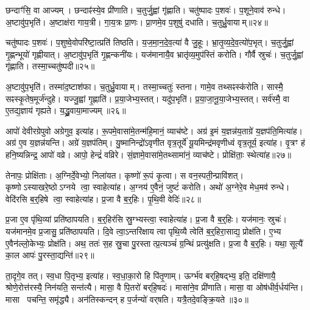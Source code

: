 छन्दाꣳ॑सि॒ वा आज्यम्।
छन्दाꣴ॑स्ये॒व प्री॑णाति।
च॒तुर्जु॒ह्वां गृ॑ह्णाति।
चतु॑ष्पादः प॒शवः॑।
प॒शूने॒वाव॑ रुन्धे।
अ॒ष्टावु॑प॒भृति॑।
अ॒ष्टाक्ष॑रा गाय॒त्री।
गा॒य॒त्रः प्रा॒णः।
प्रा॒णमे॒व प॒शुषु॑ दधाति।
च॒तुर्ध्रु॒वायाम्॥२४॥

चतु॑ष्पादः प॒शवः॑।
प॒शुष्वे॒वोपरि॑ष्टा॒त्प्रति॑ तिष्ठति।
य॒ज॒मा॒न॒दे॒व॒त्या॑ वै जु॒हूः।
भ्रा॒तृ॒व्य॒दे॒व॒त्यो॑प॒भृत्।
च॒तुर्जु॒ह्वां गृ॒ह्णन्भूयो॑ गृह्णीयात्।
अ॒ष्टावु॑प॒भृति॑ गृ॒ह्णन्कनी॑यः।
यज॑मानायै॒व भ्रातृ॑व्य॒मुप॑स्तिं करोति।
गौर्वै स्रुचः॑।
च॒तुर्जु॒ह्वां गृ॑ह्णाति।
तस्मा॒च्चतु॑ष्पदी॥२५॥

अ॒ष्टावु॑प॒भृति॑।
तस्मा॑द॒ष्टाश॑फा।
च॒तुर्ध्रु॒वायाम्।
तस्मा॒च्चतुः॑ स्तना।
गामे॒व तथ्सꣴस्क॑रोति।
सास्मै॒ सꣴस्कृ॒तेष॒मूर्ज॑न्दुहे।
यज्जु॒ह्वां गृ॒ह्णाति॑।
प्र॒या॒जेभ्य॒स्तत्।
यदु॑प॒भृति॑।
प्र॒या॒जा॒नू॒या॒जेभ्य॒स्तत्।
सर्व॑स्मै॒ वा ए॒तद्य॒ज्ञाय॑ गृह्यते।
य॒द्ध्रु॒वाया॒माज्यम्॥२६॥\anuvakamend[अ॒भि॒घा॒रय॑ति गृह्णाति ध्रु॒वायां॒ चतु॑ष्पदी प्रयाजानूया॒जेभ्य॒स्तद्द्वे च॑]

आपो॑ देवीरग्रेपुवो अग्रेगुव॒ इत्या॑ह।
रू॒पमे॒वासा॑मे॒तन्म॑हि॒मानं॒ व्याच॑ष्टे।
अग्र॑ इ॒मं य॒ज्ञन्न॑य॒ताग्रे॑ य॒ज्ञप॑ति॒मित्या॑ह।
अग्र॑ ए॒व य॒ज्ञन्न॑यन्ति।
अग्रे॑ य॒ज्ञप॑तिम्।
यु॒ष्मानिन्द्रो॑\-ऽवृणीत वृत्र॒तूर्ये॑ यू॒यमिन्द्र॑मवृणीध्वं वृत्र॒तूर्य॒ इत्या॑ह।
वृ॒त्रꣳ ह॑ हनि॒ष्यन्निन्द्र॒ आपो॑ वव्रे।
आपो॒ हेन्द्रं॑ वव्रिरे।
सं॒ज्ञामे॒वासा॑मे॒तथ्सामा॑नं॒ व्याच॑ष्टे।
प्रोक्षि॑ताः॒ स्थेत्या॑ह॥२७॥

तेनापः॒ प्रोक्षि॑ताः।
अ॒ग्निर्दे॒वेभ्यो॒ निला॑यत।
कृष्णो॑ रू॒पं कृ॒त्वा।
स वन॒स्पती॒न्प्रावि॑शत्।
कृष्णो\-ऽस्याखरे॒ष्ठो\-ऽग्नये त्वा॒ स्वाहेत्या॑ह।
अ॒ग्नय॑ ए॒वैनं॒ जुष्टं॑ करोति।
अथो॑ अ॒ग्नेरे॒व मेध॒मव॑ रुन्धे।
वेदि॑रसि ब॒र्॒हिषे त्वा॒ स्वाहेत्या॑ह।
प्र॒जा वै ब॒र्॒हिः।
पृ॒थि॒वी वेदिः॑॥२८॥

प्र॒जा ए॒व पृ॑थि॒व्यां प्रति॑ष्ठापयति।
ब॒र्॒हिर॑सि स्रु॒ग्भ्यस्त्वा॒ स्वाहेत्या॑ह।
प्र॒जा वै ब॒र्॒हिः।
यज॑मानः॒ स्रुचः॑।
यज॑मानमे॒व प्र॒जासु॒ प्रति॑ष्ठापयति।
दि॒वे त्वा॒\-ऽन्तरि॑क्षाय त्वा पृथि॒व्यै त्वेति॑ ब॒र्॒हिरा॒साद्य॒ प्रोक्ष॑ति।
ए॒भ्य ए॒वैन॑ल्लो॒केभ्यः॒ प्रोक्ष॑ति।
अथ॒ ततः॑ स॒ह स्रु॒चा पु॒रस्तात्प्र॒त्यञ्चं॑ ग्र॒न्थिं प्रत्यु॑क्षति।
प्र॒जा वै ब॒र्॒हिः।
यथा॒ सूत्यै॑ का॒ल आपः॑ पु॒रस्ता॒द्यन्ति॑॥२९॥

ता॒दृगे॒व तत्।
स्व॒धा पि॒तृभ्य॒ इत्या॑ह।
स्व॒धा॒का॒रो हि पि॑तृ॒णाम्।
ऊर्ग्भ॑व बर्‌\mbox{}हि॒षद्भ्य॒ इति॒ दक्षि॑णायै॒ श्रोणे॒रोत्त॑रस्यै॒ निन॑यति॒ सन्त॑त्यै।
मासा॒ वै पि॒तरो॑ बर्‌\mbox{}हि॒षदः॑।
मासा॑ने॒व प्री॑णाति।
मासा॒ वा ओष॑धीर्व॒र्धय॑न्ति।
मासा पचन्ति॒ समृ॑द्ध्यै।
अन॑तिस्कन्दन् ह प॒र्जन्यो॑ वर्‌\mbox{}षति।
यत्रै॒तदे॒वङ्क्रि॒यते॥३०॥

